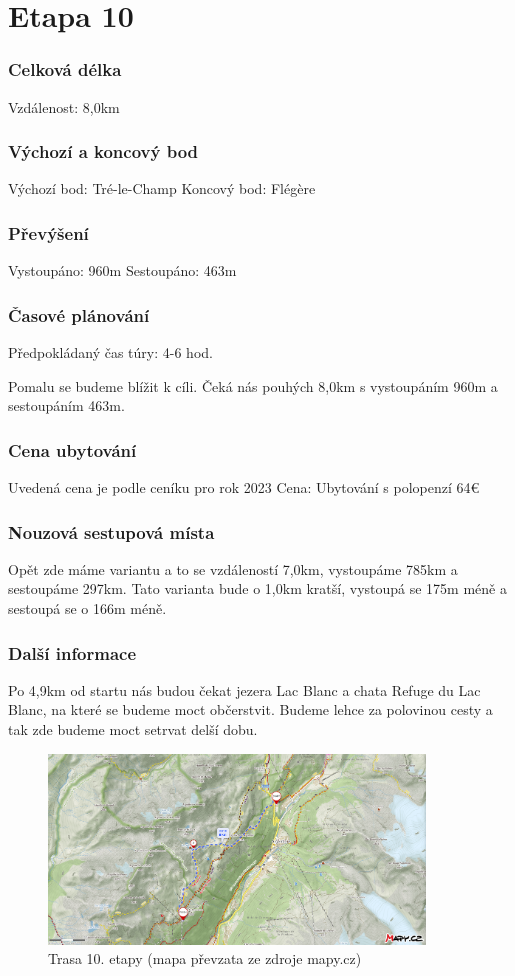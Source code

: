 \section{Etapa 10}
\subsubsection*{Celková délka}
\noindent Vzdálenost: 8,0\:km
\subsubsection*{Výchozí a koncový bod}
\noindent Výchozí bod: Tré-le-Champ 
\noindent Koncový bod: Flégère
\subsubsection*{Převýšení}
\noindent Vystoupáno: 960\:m
\noindent Sestoupáno: 463\:m
\subsubsection*{Časové plánování}
\noindent Předpokládaný čas túry: 4-6 hod.

Pomalu se budeme blížit k cíli. Čeká nás pouhých 8,0\:km s vystoupáním 960\:m a sestoupáním 463\:m.
\subsubsection*{Cena ubytování}
\noindent Uvedená cena je podle ceníku pro rok 2023
\noindent Cena: Ubytování s polopenzí 64\:€
\subsubsection*{Nouzová sestupová místa}
Opět zde máme variantu a to se vzdáleností 7,0\:km, vystoupáme 785\:km a sestoupáme 297\:km. Tato varianta bude o 1,0\:km kratší, vystoupá se 175\:m méně a sestoupá se o 166\:m méně.
\subsubsection*{Další informace}
Po 4,9\:km od startu nás budou čekat jezera Lac Blanc a chata Refuge du Lac Blanc, na které se budeme moct občerstvit. Budeme lehce za polovinou cesty a tak zde budeme moct setrvat delší dobu.
\begin{figure}[!hbt]
	\centering
	\includegraphics[width=10.0cm]{Figures/day_10.png}
	\caption[Trasa: den desátý]{Trasa 10. etapy (mapa převzata ze zdroje mapy.cz)}
	\label{Obr:day_10}
\end{figure} 
